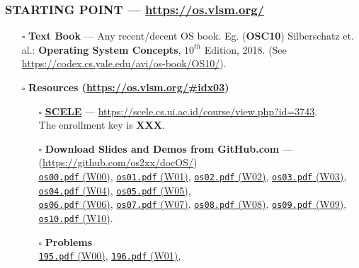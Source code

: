 \begin{frame}[fragile]
\frametitle{\textbf{STARTING POINT} --- 
{
\hypersetup{colorlinks,linkcolor=,urlcolor=links}
\url{https://os.vlsm.org/}
}
}
\begin{itemize}
\item[$\square$] \textbf{Text Book} ---
                 Any recent/decent OS book. Eg. (\textbf{OSC10}) Silberschatz et. al.: 
                 \textbf{Operating System Concepts}, $10^{th}$ Edition, 2018.
                 (See \url{https://codex.cs.yale.edu/avi/os-book/OS10/}).
\item[$\square$] \textbf{Resources ({\footnotesize \url{https://os.vlsm.org/\#idx03}})}
\begin{itemize}
\item[$\square$] \href{https://scele.cs.ui.ac.id/course/view.php?id=3743}{\textbf{SCELE}} ---
\url{https://scele.cs.ui.ac.id/course/view.php?id=3743}.\\
The enrollment key is \textbf{XXX}.
\item[$\square$] \textbf{Download Slides and Demos from GitHub.com} --- (\url{https://github.com/os2xx/docOS/})\\
                 {\scriptsize%
                 \href{https://docOS.vlsm.org/Slides/os00.pdf}{\texttt{os00.pdf} (W00)},
                 \href{https://docOS.vlsm.org/Slides/os01.pdf}{\texttt{os01.pdf} (W01)},
                 \href{https://docOS.vlsm.org/Slides/os02.pdf}{\texttt{os02.pdf} (W02)},
                 \href{https://docOS.vlsm.org/Slides/os03.pdf}{\texttt{os03.pdf} (W03)},
                 \href{https://docOS.vlsm.org/Slides/os04.pdf}{\texttt{os04.pdf} (W04)},
                 \href{https://docOS.vlsm.org/Slides/os05.pdf}{\texttt{os05.pdf} (W05)},\\
                 \href{https://docOS.vlsm.org/Slides/os06.pdf}{\texttt{os06.pdf} (W06)},
                 \href{https://docOS.vlsm.org/Slides/os07.pdf}{\texttt{os07.pdf} (W07)},
                 \href{https://docOS.vlsm.org/Slides/os08.pdf}{\texttt{os08.pdf} (W08)},
                 \href{https://docOS.vlsm.org/Slides/os09.pdf}{\texttt{os09.pdf} (W09)},
                 \href{https://docOS.vlsm.org/Slides/os10.pdf}{\texttt{os10.pdf} (W10)}.
                 }
\item[$\square$] \textbf{Problems}\\
                 {\scriptsize%
                 \href{https://rms46.vlsm.org/2/195.pdf}{\texttt{195.pdf} (W00)},
                 \href{https://rms46.vlsm.org/2/196.pdf}{\texttt{196.pdf} (W01)},
}
\end{itemize}
\end{itemize}
\end{frame}

